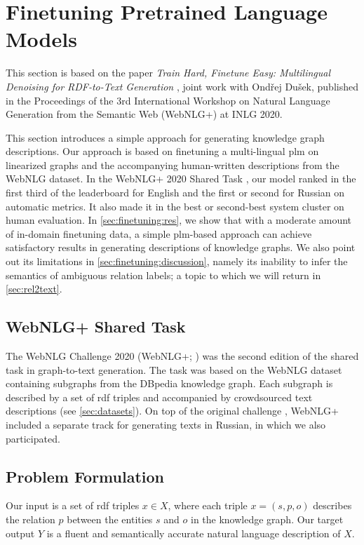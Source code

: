 \section{Finetuning Pretrained Language Models}
\label{sec:finetuning}

\begin{refbox}
    This section is based on the paper \emph{Train Hard, Finetune Easy: Multilingual Denoising for RDF-to-Text Generation} \cite{kasnerTrainHardFinetune2020}, joint work with Ondřej Dušek, published in the Proceedings of the 3rd International Workshop on Natural Language Generation from the Semantic Web (WebNLG+) at INLG 2020.
\end{refbox}


This section introduces a simple approach for generating knowledge graph descriptions. Our approach is based on finetuning a multi-lingual \ac{plm} on linearized graphs and the accompanying human-written descriptions from the WebNLG dataset. In the WebNLG+ 2020 Shared Task \cite{ferreira20202020}, our model ranked in the first third of the leaderboard for English and the first or second for Russian on automatic metrics. It also made it in the best or second-best system cluster on human evaluation. In \autoref{sec:finetuning:res}, we show that with a moderate amount of in-domain finetuning data, a simple \ac{plm}-based approach can achieve satisfactory results in generating descriptions of knowledge graphs. We also point out its limitations in \autoref{sec:finetuning:discussion}, namely its inability to infer the semantics of ambiguous relation labels; a topic to which we will return in \autoref{sec:rel2text}.

\subsection{WebNLG+ Shared Task}
\label{sec:webnlgp}
The WebNLG Challenge 2020 (WebNLG+; \citealp{ferreira20202020}) was the second edition of the shared task in graph-to-text generation. The task was based on the WebNLG dataset containing subgraphs from the DBpedia knowledge graph. Each subgraph is described by a set of \acs{rdf} triples and accompanied by crowdsourced text descriptions (see \autoref{sec:datasets}). On top of the original challenge \cite{gardentWebNLGChallengeGenerating2017}, WebNLG+ included a separate track for generating texts in Russian, in which we also participated.


\subsection{Problem Formulation}
\label{sec:mbart}
Our input is a set of \ac{rdf} triples $x \in X$, where each triple $x = (s, p, o)$ describes the relation $p$ between the entities $s$ and $o$ in the knowledge graph. Our target output $Y$ is a fluent and semantically accurate natural language description of $X$.


